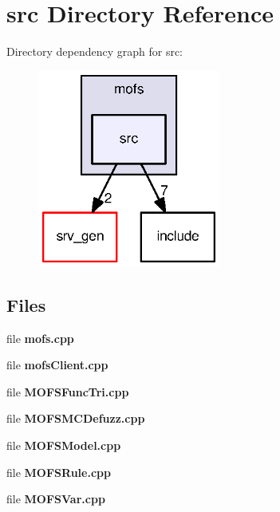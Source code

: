 \section{src Directory Reference}
\label{dir_28c8dc574ac7a596e4318b158d47249b}
Directory dependency graph for src\-:
\nopagebreak
\begin{figure}[H]
\begin{center}
\leavevmode
\includegraphics[width=170pt]{dir_28c8dc574ac7a596e4318b158d47249b_dep}
\end{center}
\end{figure}
\subsection*{Files}
\begin{DoxyCompactItemize}
\item 
file {\bf mofs.\-cpp}
\item 
file {\bf mofs\-Client.\-cpp}
\item 
file {\bf M\-O\-F\-S\-Func\-Tri.\-cpp}
\item 
file {\bf M\-O\-F\-S\-M\-C\-Defuzz.\-cpp}
\item 
file {\bf M\-O\-F\-S\-Model.\-cpp}
\item 
file {\bf M\-O\-F\-S\-Rule.\-cpp}
\item 
file {\bf M\-O\-F\-S\-Var.\-cpp}
\end{DoxyCompactItemize}
